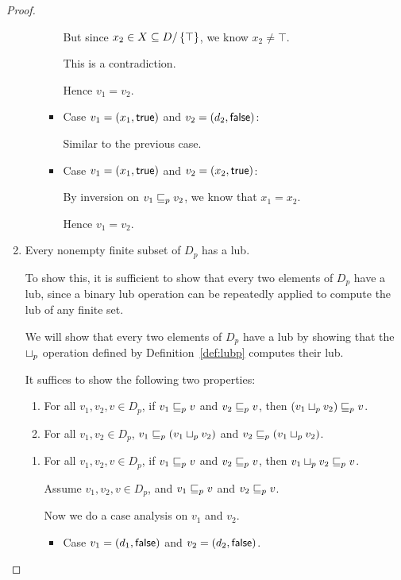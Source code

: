 \begin{proof}
\begin{enumerate}
\begin{enumerate}
\begin{itemize}
        But since $x_2 \in X \subseteq D/\left\{\top\right\}$, we know $x_2 \not= \top$.

        This is a contradiction.

        Hence $v_1 = v_2$. 
        
      \item Case $v_1 = (x_1, \textsf{true})$ and $v_2 =
        (d_2, \textsf{false})$:

        Similar to the previous case. 

      \item Case $v_1 = (x_1, \textsf{true})$ and $v_2 =
        (x_2, \textsf{true})$:

        By inversion on $v_1 \sqsubseteq_p v_2$, we know that $x_1 = x_2$.

        Hence $v_1 = v_2$. 
      \end{itemize}
    \end{enumerate}

  \item Every nonempty finite subset of $D_p$ has a lub.

    To show this, it is sufficient to show that every two elements of
    $D_p$ have a lub, since a binary lub operation can be repeatedly
    applied to compute the lub of any finite set.

    We will show that every two elements of $D_p$ have a lub by
    showing that the $ \sqcup_p $ operation defined by
    Definition~\ref{def:lubp} computes their lub.

    It suffices to show the following two properties:
    \begin{enumerate}
    \item For all $v_1, v_2, v \in D_p$, if $v_1 \sqsubseteq_p v$ and $v_2
      \sqsubseteq_p v$, then $(v_1 \sqcup_p v_2) \sqsubseteq_p v$.
    \item For all $v_1, v_2 \in D_p$, $v_1 \sqsubseteq_p (v_1 \sqcup_p v_2)$
      and $v_2 \sqsubseteq_p (v_1 \sqcup_p v_2)$.
    \end{enumerate}
    \begin{enumerate}
    \item For all $v_1, v_2, v \in D_p$, if $v_1 \sqsubseteq_p v$ and $v_2
      \sqsubseteq_p v$, then $v_1 \sqcup_p v_2 \sqsubseteq_p v$.
      
      Assume $v_1, v_2, v \in D_p$, and $v_1 \sqsubseteq_p v$ and $v_2 \sqsubseteq_p
      v$.

      Now we do a case analysis on $v_1$ and $v_2$.
      \begin{itemize}
      \item Case $v_1 = (d_1, \textsf{false})$ and $v_2 =
        (d_2, \textsf{false})$.
        

\end{itemize}
\end{enumerate}
\end{enumerate}
\end{proof}
